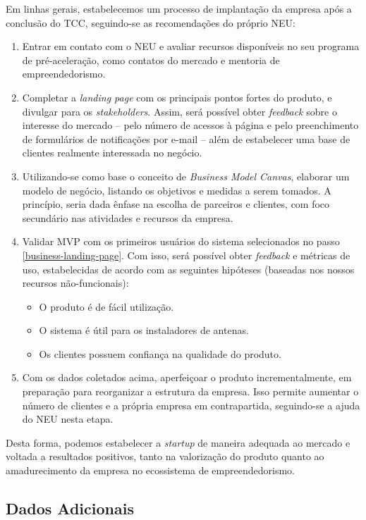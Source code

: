\documentclass[]{politex}
\begin{document}
Em linhas gerais, estabelecemos um processo de implantação da empresa após a
conclusão do TCC, seguindo-se as recomendações do próprio NEU:

\begin{enumerate}
\item Entrar em contato com o NEU e avaliar recursos disponíveis no seu
programa de pré-aceleração, como contatos do mercado e mentoria de
empreendedorismo.
\item\label{business-landing-page} Completar a \textit{landing page} com os
principais pontos fortes do produto, e divulgar para os \textit{stakeholders}.
Assim, será possível obter \textit{feedback} sobre o interesse do mercado --
pelo número de acessos à página e pelo preenchimento de formulários de
notificações por e-mail -- além de estabelecer uma base de clientes realmente
interessada no negócio.
\item Utilizando-se como base o conceito de \textit{Business Model Canvas},
elaborar um modelo de negócio, listando os objetivos e medidas a serem tomados.
A princípio, seria dada ênfase na escolha de parceiros e clientes, com foco
secundário nas atividades e recursos da empresa.
\item Validar MVP com os primeiros usuários do sistema selecionados no passo
\ref{business-landing-page}. Com isso, será possível obter \textit{feedback} e
métricas de uso, estabelecidas de acordo com as seguintes hipóteses (baseadas
nos nossos recursos não-funcionais):
\begin{itemize}
\item O produto é de fácil utilização.
\item O sistema é útil para os instaladores de antenas.
\item Os clientes possuem confiança na qualidade do produto.
\end{itemize}
\item Com os dados coletados acima, aperfeiçoar o produto incrementalmente, em
preparação para reorganizar a estrutura da empresa. Isso permite aumentar o
número de clientes e a própria empresa em contrapartida, seguindo-se a ajuda
do NEU nesta etapa.
\end{enumerate}

Desta forma, podemos estabelecer a \textit{startup} de maneira adequada ao
mercado e voltada a resultados positivos, tanto na valorização do produto quanto
ao amadurecimento da empresa no ecossistema de empreendedorismo.

\subsection{Dados Adicionais}
\end{document}
